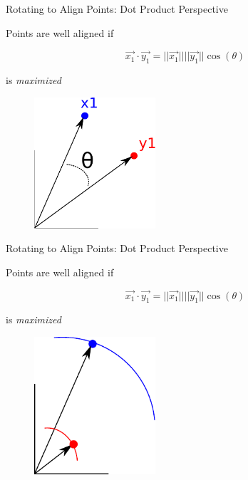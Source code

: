 \documentclass{beamer}
\begin{document}
\begin{frame}{Rotating to Align Points: Dot Product Perspective}

Points are well aligned if 

\[ \vec{x_1} \cdot \vec{y_1} = ||\vec{x_1}|| ||\vec{y_1}|| \cos(\theta) \]

is {\em maximized}

\begin{figure}[t]
	\centering
    \includegraphics[width=0.4\textwidth]{PointsAlign.pdf}
\end{figure}

\end{frame}



\begin{frame}{Rotating to Align Points: Dot Product Perspective}

Points are well aligned if 

\[ \vec{x_1} \cdot \vec{y_1} = ||\vec{x_1}|| ||\vec{y_1}|| \cos(\theta) \]

is {\em maximized}

\begin{figure}[t]
	\centering
    \includegraphics[width=0.4\textwidth]{PointsAlignArc.pdf}
\end{figure}

\end{frame}
\end{document}
